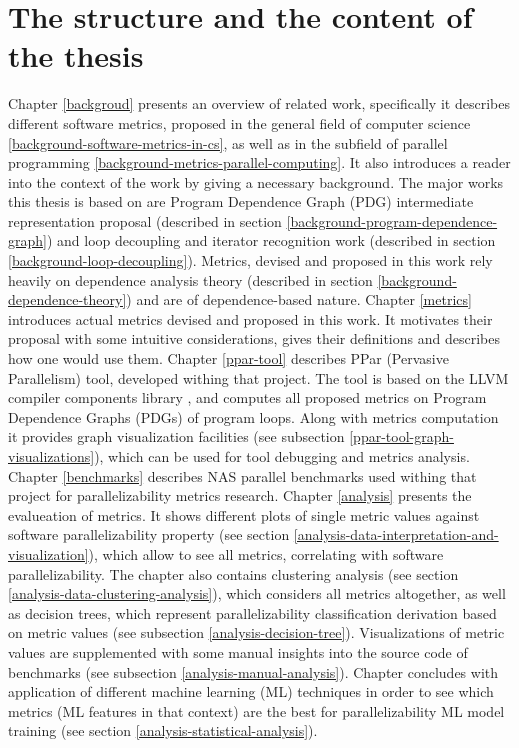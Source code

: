 \section{The structure and the content of the thesis}
\qquad Chapter \ref{backgroud} presents an overview of related work, specifically it describes different software metrics, proposed in the general field of computer science \ref{background-software-metrics-in-cs}, as well as in the subfield of parallel programming \ref{background-metrics-parallel-computing}. It also introduces a reader into the context of the work by giving a necessary background. The major works this thesis is based on are Program Dependence Graph (PDG) intermediate representation proposal \cite{pdg-paper} (described in section \ref{background-program-dependence-graph}) and loop decoupling and iterator recognition work \cite{iterator-recognition-paper} (described in section \ref{background-loop-decoupling}). Metrics, devised and proposed in this work rely heavily on dependence analysis theory \cite{optimizing-compilers-book} (described in section \ref{background-dependence-theory}) and are of dependence-based nature.\newline
\null\qquad Chapter \ref{metrics} introduces actual metrics devised and proposed in this work. It motivates their proposal with some intuitive considerations, gives their definitions and describes how one would use them.\newline
\null\qquad Chapter \ref{ppar-tool} describes PPar (Pervasive Parallelism) tool, developed withing that project. The tool is based on the LLVM compiler components library \cite{llvm-paper}, \cite{llvm-official-website} and computes all proposed metrics on Program Dependence Graphs (PDGs) of program loops. Along with metrics computation it provides graph visualization facilities (see subsection \ref{ppar-tool-graph-visualizations}), which can be used for tool debugging and metrics analysis.\newline
\null\qquad Chapter \ref{benchmarks} describes NAS parallel benchmarks used withing that project for parallelizability metrics research.\newline
\null\qquad Chapter \ref{analysis} presents the evalueation of metrics. It shows different plots of single metric values against software parallelizability property (see section \ref{analysis-data-interpretation-and-visualization}), which allow to see all metrics, correlating with software parallelizability. The chapter also contains clustering analysis (see section \ref{analysis-data-clustering-analysis}), which considers all metrics altogether, as well as decision trees, which represent parallelizability classification derivation based on metric values (see subsection \ref{analysis-decision-tree}). Visualizations of metric values are supplemented with some manual insights into the source code of benchmarks (see subsection \ref{analysis-manual-analysis}). Chapter concludes with application of different machine learning (ML) techniques in order to see which metrics (ML features in that context) are the best for parallelizability ML model training (see section \ref{analysis-statistical-analysis}). 